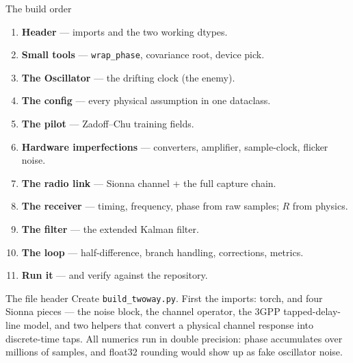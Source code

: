 \documentclass[10pt]{beamer}
\begin{document}
\begin{frame}{The build order}
  \begin{enumerate}
    \item \textbf{Header} --- imports and the two working dtypes.
    \item \textbf{Small tools} --- \texttt{wrap\_phase}, covariance
      root, device pick.
    \item \textbf{The Oscillator} --- the drifting clock (the enemy).
    \item \textbf{The config} --- every physical assumption in one
      dataclass.
    \item \textbf{The pilot} --- Zadoff--Chu training fields.
    \item \textbf{Hardware imperfections} --- converters, amplifier,
      sample-clock, flicker noise.
    \item \textbf{The radio link} --- Sionna channel + the full
      capture chain.
    \item \textbf{The receiver} --- timing, frequency, phase from raw
      samples; $R$ from physics.
    \item \textbf{The filter} --- the extended Kalman filter.
    \item \textbf{The loop} --- half-difference, branch handling,
      corrections, metrics.
    \item \textbf{Run it} --- and verify against the repository.
  \end{enumerate}
\end{frame}

\begin{frame}{The file header}
  Create \texttt{build\_twoway.py}. First the imports: torch,
  and four Sionna pieces --- the noise block, the channel
  operator, the 3GPP tapped-delay-line model, and two helpers
  that convert a physical channel response into discrete-time
  taps. All numerics run in double precision: phase
  accumulates over millions of samples, and float32 rounding
  would show up as fake oscillator noise.
\end{frame}
\end{document}
